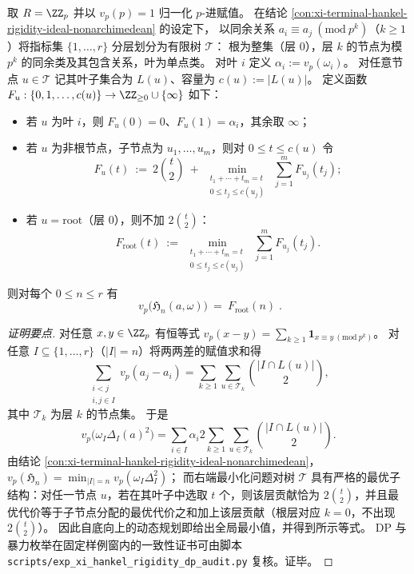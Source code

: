 \begin{conclusion}\label{con:xi-terminal-hankel-rigidity-dp}
取 \(R=\ZZ_p\) 并以 \(v_p(p)=1\) 归一化 \(p\)-进赋值。
在结论 \ref{con:xi-terminal-hankel-rigidity-ideal-nonarchimedean} 的设定下，
以同余关系 \(a_i\equiv a_j\ (\mathrm{mod}\ p^k)\)（\(k\ge 1\)）将指标集 \(\{1,\dots,r\}\) 分层划分为有限树 \(\mathcal T\)：
根为整集（层 \(0\)），层 \(k\) 的节点为模 \(p^k\) 的同余类及其包含关系，叶为单点类。
对叶 \(i\) 定义 \(\alpha_i:=v_p(\omega_i)\)。
对任意节点 \(u\in\mathcal T\) 记其叶子集合为 \(L(u)\)、容量为 \(c(u):=|L(u)|\)。
定义函数
\(
F_u:\{0,1,\dots,c(u)\}\to\ZZ_{\ge 0}\cup\{\infty\}
\)
如下：
\begin{itemize}
  \item 若 \(u\) 为叶 \(i\)，则 \(F_u(0)=0\)、\(F_u(1)=\alpha_i\)，其余取 \(\infty\)；
  \item 若 \(u\) 为非根节点，子节点为 \(u_1,\dots,u_m\)，则对 \(0\le t\le c(u)\) 令
  \[
  F_u(t)\ :=\ 2\binom{t}{2}\ +\ \min_{\substack{t_1+\cdots+t_m=t\\ 0\le t_j\le c(u_j)}}\ \sum_{j=1}^m F_{u_j}(t_j);
  \]
  \item 若 \(u=\mathrm{root}\)（层 \(0\)），则不加 \(2\binom{t}{2}\)：
  \[
  F_{\mathrm{root}}(t)\ :=\ \min_{\substack{t_1+\cdots+t_m=t\\ 0\le t_j\le c(u_j)}}\ \sum_{j=1}^m F_{u_j}(t_j).
  \]
\end{itemize}
则对每个 \(0\le n\le r\) 有
\[
\boxed{\;v_p\!\bigl(\mathfrak H_n(a,\omega)\bigr)\ =\ F_{\mathrm{root}}(n)\; }.
\]
\end{conclusion}
\begin{proof}[证明要点]
对任意 \(x,y\in\ZZ_p\) 有恒等式
\(
v_p(x-y)=\sum_{k\ge 1}\mathbf{1}_{x\equiv y\ (\mathrm{mod}\ p^k)}
\)。
对任意 \(I\subseteq\{1,\dots,r\}\)（\(|I|=n\)）将两两差的赋值求和得
\[
\sum_{\substack{i<j\\ i,j\in I}}v_p(a_j-a_i)
=\sum_{k\ge 1}\sum_{u\in\mathcal T_k}\binom{|I\cap L(u)|}{2},
\]
其中 \(\mathcal T_k\) 为层 \(k\) 的节点集。
于是
\[
v_p\!\bigl(\omega_I\Delta_I(a)^2\bigr)
=\sum_{i\in I}\alpha_i
2\sum_{k\ge 1}\sum_{u\in\mathcal T_k}\binom{|I\cap L(u)|}{2}.
\]
由结论 \ref{con:xi-terminal-hankel-rigidity-ideal-nonarchimedean}，
\(
v_p(\mathfrak H_n)=\min_{|I|=n}v_p(\omega_I\Delta_I^2)
\)；
而右端最小化问题对树 \(\mathcal T\) 具有严格的最优子结构：对任一节点 \(u\)，若在其叶子中选取 \(t\) 个，则该层贡献恰为 \(2\binom{t}{2}\)，并且最优代价等于子节点分配的最优代价之和加上该层贡献（根层对应 \(k=0\)，不出现 \(2\binom{t}{2}\)）。
因此自底向上的动态规划即给出全局最小值，并得到所示等式。
DP 与暴力枚举在固定样例窗内的一致性证书可由脚本 \texttt{scripts/exp\_xi\_hankel\_rigidity\_dp\_audit.py} 复核。证毕。
\end{proof}

